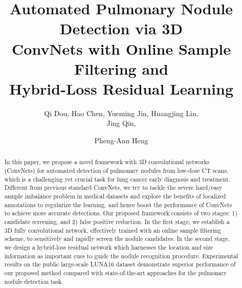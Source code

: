 \documentclass{llncs}
\begin{document}
\title{Automated Pulmonary Nodule Detection via 3D \\ ConvNets with Online Sample Filtering and \\ Hybrid-Loss Residual Learning}


\author{Qi Dou, %
Hao Chen, %
Yueming Jin, %
Huangjing Lin, %
\\ Jing Qin, %
\and Pheng-Ann Heng} %
\maketitle

\begin{abstract}
In this paper, we propose a novel framework with 3D convolutional networks (ConvNets) for automated detection of pulmonary nodules from low-dose CT scans, which is a challenging yet crucial task for lung cancer early diagnosis and treatment.
Different from previous standard ConvNets, we try to tackle the severe hard/easy sample imbalance problem in medical datasets and explore the benefits of localized annotations to regularize the learning, and hence boost the performance of ConvNets to achieve more accurate detections.
Our proposed framework consists of two stages: 1) candidate screening, and 2) false positive reduction.
In the first stage, we establish a 3D fully convolutional network, effectively trained with an online sample filtering scheme, to sensitively and rapidly screen the nodule candidates.
In the second stage, we design a hybrid-loss residual network which harnesses the location and size information as important cues to guide the nodule recognition procedure.
Experimental results on the public large-scale LUNA16 dataset demonstrate superior performance of our proposed method compared with state-of-the-art approaches for the pulmonary nodule detection task.
\end{abstract}
\end{document}
